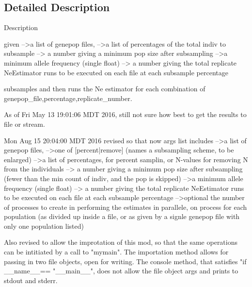 \subsection{Detailed Description}
\begin{DoxyVerb}Description

given 
    -->a list of genepop files, 
    -->a list of percentages of the total indiv
       to subsample
    --> a number giving a minimum pop size 
       after subsampling
    -->a minimum allele frequency (single float)
    --> a number giving the total replicate NeEstimator runs 
to be executed on each file at each subsample percentage 

    subsamples and then runs the Ne estimator for each combination of 
    genepop_file,percentage,replicate_number. 
    
    As of Fri May 13 19:01:06 MDT 2016, still not sure
    how best to get the results to file or stream.

Mon Aug 15 20:04:00 MDT 2016
    revised so that now args list includes
    -->a list of genepop files, 
    -->one of [percent|remove] (names a subsampling scheme, to be enlarged)
    -->a list of percentages, for percent samplin, or N-values for removing N
from the individuals    
    --> a number giving a minimum pop size 
       after subsampling (fewer than the min count of indiv, and the pop is skipped)
    -->a minimum allele frequency (single float)
    --> a number giving the total replicate NeEstimator runs 
to be executed on each file at each subsample percentage 
    -->optional the number of processes to create in performing the
estimates in parallele, on process for each population (as divided up inside a file,
or as given by a signle genepop file with only one population listed)
    
    Also revised to allow the improtation of this mod, so that the same operations
    can be intitiated by a call to "mymain".  The importation method allows for 
    passing in two file objects, open for writing.  The console method, that satisfies
    "if __name__== "__main__", does not allow the file object args and prints to stdout and stderr.


\end{DoxyVerb}
